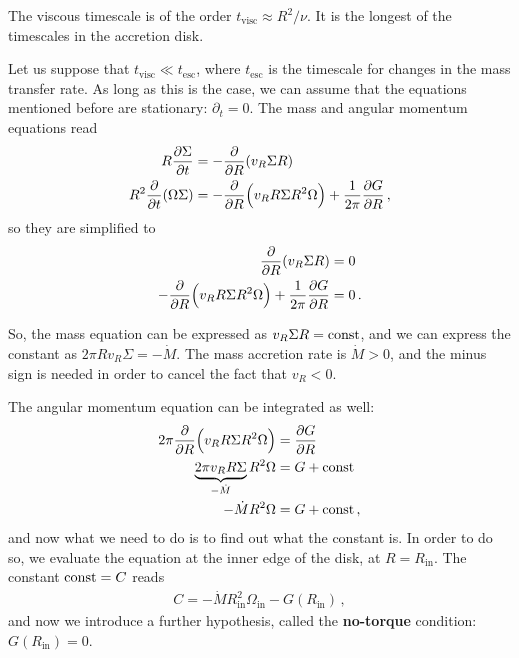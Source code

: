 \documentclass[main.tex]{subfiles}
\begin{document}

The viscous timescale is of the order \(t _{\text{visc}} \approx R^2 / \nu \). 
It is the longest of the timescales in the accretion disk. 

Let us suppose that \(t _{\text{visc}} \ll t _{\text{esc}}\), where \(t _{\text{esc}}\) is the timescale for changes in the mass transfer rate. 
As long as this is the case, we can assume that the equations mentioned before are stationary: \(\partial_{t} = 0\). 
The mass and angular momentum equations read 
%
\begin{align}
R \pdv{\Sigma }{t} &= - \pdv{}{R} \qty(v_R \Sigma R )  \\
R^2 \pdv{t}(\Omega \Sigma ) &= - \pdv{}{R} \qty(v_R R \Sigma R^2 \Omega ) + \frac{1}{2 \pi } \pdv{G}{R}
\,,
\end{align}
%
so they are simplified to 
%
\begin{align}
\pdv{}{R} \qty( v_R \Sigma R) &=0  \\
-\pdv{}{R} \qty(v_R R \Sigma R^2 \Omega ) + \frac{1}{2 \pi } \pdv{G}{R}&= 0
\,.
\end{align}

So, the mass equation can be expressed as \(v_R \Sigma R = \text{const}\), and we can express the constant as \(2 \pi R v_R \Sigma = - \dot{M}\). 
The mass accretion rate is \(\dot{M}> 0\), and the minus sign is needed in order to cancel the fact that \(v_R < 0\). 

The angular momentum equation can be integrated as well:
%
\begin{align}
2 \pi 
\pdv{}{R} \qty(v_R R \Sigma R^2 \Omega )
&= \pdv{G}{R} \\
\underbrace{2 \pi v_R R \Sigma}_{-\dot{M}} R^2 \Omega &= G + \text{const}  \\
- \dot{M} R^2 \Omega  &= G + \text{const}
\,,
\end{align}
%
and now what we need to do is to find out what the constant is. In order to do so, we evaluate the equation at the inner edge of the disk, at \(R = R _{\text{in}}\). 
The constant \(\text{const} = C\) reads 
%
\begin{align}
C = - \dot{M} R _{\text{in}}^2 \Omega _{\text{in}} - G(R _{\text{in}})
\,,
\end{align}
%
and now we introduce a further hypothesis, called the \textbf{no-torque} condition: \(G (R _{\text{in}}) = 0\). 
\end{document}
